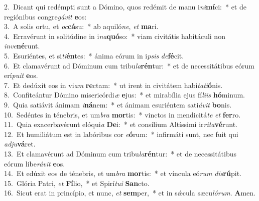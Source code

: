 {2.~}Dicant qui redémpti sunt a Dómino, quos redémit de manu i\textit{ni}\textbf{mí}ci:~* et de regiónibus congre\textit{gá}\textit{vit} \textbf{e}os:\\
{3.~}A solis ortu, et \textit{oc}\textbf{cá}su:~* ab aquiló\textit{ne}, \textit{et} \textbf{ma}ri.\\
{4.~}Erravérunt in solitúdine in i\textit{na}\textbf{quó}so:~* viam civitátis habitáculi non \textit{in}\textit{ve}\textbf{né}runt.\\
{5.~}Esuriéntes, et si\textit{ti}\textbf{én}tes:~* ánima eórum in i\textit{psis} \textit{de}\textbf{fé}cit.\\
{6.~}Et clamavérunt ad Dóminum cum tribu\textit{la}\textbf{rén}tur:~* et de necessitátibus eórum erí\textit{pu}\textit{it} \textbf{e}os.\\
{7.~}Et dedúxit eos in vi\textit{am} \textbf{re}ctam:~* ut irent in civitátem habi\textit{ta}\textit{ti}\textbf{ó}nis.\\
{8.~}Confiteántur Dómino misericórdi\textit{æ} \textbf{e}jus:~* et mirabília ejus fí\textit{li}\textit{is} \textbf{hó}minum.\\
{9.~}Quia satiávit ánimam \textit{i}\textbf{ná}nem:~* et ánimam esuriéntem sati\textit{á}\textit{vit} \textbf{bo}nis.\\
{10.~}Sedéntes in ténebris, et um\textit{bra} \textbf{mor}tis:~* vinctos in mendicitá\textit{te} \textit{et} \textbf{fer}ro.\\
{11.~}Quia exacerbavérunt elóqui\textit{a} \textbf{De}i:~* et consílium Altíssimi ir\textit{ri}\textit{ta}\textbf{vé}runt.\\
{12.~}Et humiliátum est in labóribus cor \textit{e}\textbf{ó}rum:~* infirmáti sunt, nec fuit qui \textit{ad}\textit{ju}\textbf{vá}ret.\\
{13.~}Et clamavérunt ad Dóminum cum tribu\textit{la}\textbf{rén}tur:~* et de necessitátibus eórum libe\textit{rá}\textit{vit} \textbf{e}os.\\
{14.~}Et edúxit eos de ténebris, et um\textit{bra} \textbf{mor}tis:~* et víncula eó\textit{rum} \textit{dis}\textbf{rú}pit.\\
{15.~}Glória Patri, \textit{et} \textbf{Fí}lio,~* et Spirí\textit{tu}\textit{i} \textbf{San}cto.\\
{16.~}Sicut erat in princípio, et nunc, \textit{et} \textbf{sem}per,~* et in sǽcula sæcu\textit{ló}\textit{rum}. \textbf{A}men.\\

